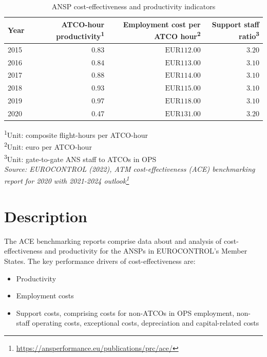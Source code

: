 \documentclass[
  11pt,
  a4paper,
]{book}
\DeclareRobustCommand{\href}[2]{#2\footnote{\url{#1}}}
\begin{document}
\hypertarget{tbl-atm-cost-effectiveness}{}
\setlength{\LTpost}{0mm}
\begin{longtable}{lrrr}
\caption{\label{tbl-atm-cost-effectiveness}ANSP cost-effectiveness and productivity indicators }\tabularnewline

\toprule
Year & ATCO-hour productivity\textsuperscript{1} & Employment cost per ATCO hour\textsuperscript{2} & Support staff ratio\textsuperscript{3} \\ 
\midrule
2015 & 0.83 & $\text{EUR}112.00$ & $3.20$ \\ 
2016 & 0.84 & $\text{EUR}113.00$ & $3.10$ \\ 
2017 & 0.88 & $\text{EUR}114.00$ & $3.10$ \\ 
2018 & 0.93 & $\text{EUR}115.00$ & $3.10$ \\ 
2019 & 0.97 & $\text{EUR}118.00$ & $3.10$ \\ 
2020 & 0.47 & $\text{EUR}131.00$ & $3.20$ \\ 
\bottomrule
\end{longtable}
\begin{minipage}{\linewidth}
\textsuperscript{1}Unit: composite flight-hours per ATCO-hour\\
\textsuperscript{2}Unit: euro per ATCO-hour\\
\textsuperscript{3}Unit: gate-to-gate ANS staff to ATCOs in OPS\\
\emph{Source: \href{https://ansperformance.eu/publications/prc/ace/}{EUROCONTROL (2022), ATM cost-effectiveness (ACE) benchmarking report for 2020 with 2021-2024 outlook}}\\
\end{minipage}

\hypertarget{description-13}{%
\section{Description}\label{description-13}}

The ACE benchmarking reports comprise data about and analysis of
cost-effectiveness and productivity for the ANSPs in EUROCONTROL's
Member States. The key performance drivers of cost-effectiveness are:

\begin{itemize}
\item
  Productivity
\item
  Employment costs
\item
  Support costs, comprising costs for non-ATCOs in OPS employment,
  non-staff operating costs, exceptional costs, depreciation and
  capital-related costs
\end{itemize}
\end{document}
